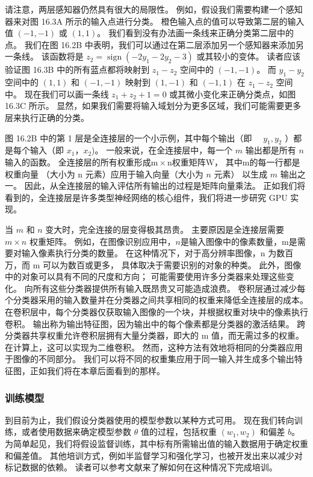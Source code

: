 请注意，两层感知器仍然具有很大的局限性。 例如，假设我们需要构建一个感知器来对图 16.3A 所示的输入点进行分类。 
橙色输入点的值可以导致第二层的输入值 $(-1,-1)$ 或 $(1,1)$。 我们看到没有办法画一条线来正确分类第二层中的点。 
我们在图 16.2B 中表明，我们可以通过在第二层添加另一个感知器来添加另一条线。 
该函数将是 $z_{2}=\operatorname{sign}\left(-2 y_{1}-2 y_{2}-3\right)$ 或其较小的变体。 
读者应该验证图 16.3B 中的所有蓝点都将映射到 $z_{1}-z_{2}$ 空间中的 $(-1,-1)$。 
而 $y_{1}-y_{2}$ 空间中的 $(1,1)$ 和 $(-1,-1)$ 映射到 $(1,-1)$ 和 $(-1,1 )$ 在 $z_{1}-z_{2}$ 空间中。 
现在我们可以画一条线 $z_{1}+z_{2}+1=0$ 或其微小变化来正确分类点，如图 16.3C 所示。 
显然，如果我们需要将输入域划分为更多区域，我们可能需要更多层来执行正确的分类。

图 16.2B 中的第 1 层是全连接层的一个小示例，其中每个输出（即 $\quad y_{1}, y_{2}$ ）都是每个输入（即 $x_{ 1}，x_{2}$)。 
一般来说，在全连接层中，每一个 $m$ 输出都是所有 $n$ 输入的函数。 
全连接层的所有权重形成$\mathrm{m} \times \mathrm{n}$权重矩阵$\mathrm{W}$，
其中$\mathrm{m}$的每一行都是权重向量 （大小为 $\mathrm{n}$ 元素）应用于输入向量（大小为 $n$ 元素）
以生成 $m$ 输出之一。 因此，从全连接层的输入评估所有输出的过程是矩阵向量乘法。 
正如我们将看到的，全连接层是许多类型神经网络的核心组件，我们将进一步研究 GPU 实现。

当 $m$ 和 $n$ 变大时，完全连接的层变得极其昂贵。 主要原因是全连接层需要 $m \times n$ 权重矩阵。 
例如，在图像识别应用中，$n$是输入图像中的像素数量，$\mathrm{m}$是需要对输入像素执行分类的数量。 
在这种情况下，对于高分辨率图像，$\mathrm{n}$ 为数百万，而 $\mathrm{m}$ 可以为数百或更多，
具体取决于需要识别的对象的种类。 此外，图像中的对象可以具有不同的尺度和方向； 可能需要使用许多分类器来处理这些变化。 
向所有这些分类器提供所有输入既昂贵又可能造成浪费。 
卷积层通过减少每个分类器采用的输入数量并在分类器之间共享相同的权重来降低全连接层的成本。 
在卷积层中，每个分类器仅获取输入图像的一个块，并根据权重对块中的像素执行卷积。 
输出称为输出特征图，因为输出中的每个像素都是分类器的激活结果。 
跨分类器共享权重允许卷积层拥有大量分类器，即大的 $\mathrm{m}$ 值，而无需过多的权重。 
在计算上，这可以实现为二维卷积。 然而，这种方法有效地将相同的分类器应用于图像的不同部分。 
我们可以将不同的权重集应用于同一输入并生成多个输出特征图，正如我们将在本章后面看到的那样。

\subsubsection{训练模型}
到目前为止，我们假设分类器使用的模型参数以某种方式可用。 
现在我们转向训练，或者使用数据来确定模型参数 $\theta$ 值的过程，包括权重 $\left(w_{1}, w_{2}\right)$ 和偏差 $b $。 
为简单起见，我们将假设监督训练，其中标有所需输出值的输入数据用于确定权重和偏差值。 
其他培训方式，例如半监督学习和强化学习，也被开发出来以减少对标记数据的依赖。 
读者可以参考文献来了解如何在这种情况下完成培训。

